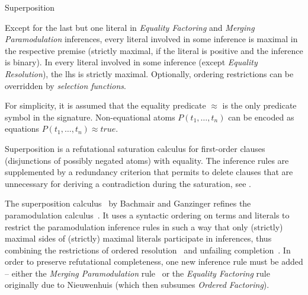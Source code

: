 \begin{entry}{Superposition}
\begin{calculus}
\vspace{\myspace}

Except for the last but one literal in
\textit{Equality Factoring} and \textit{Merging Paramodulation} inferences,
every literal involved in some inference
is maximal in the respective premise
(strictly maximal, if the literal is positive and the inference is binary).
In every literal involved in some inference
(except \textit{Equality Resolution}),
the lhs is strictly maximal.
Optionally,
ordering restrictions can be overridden by \emph{selection functions}.

\vspace{\myspace}

For simplicity, it is assumed that the equality predicate $\approx$
is the only predicate symbol in the signature.
Non-equational atoms $P(t_1,\dots,t_n)$ can be encoded as
equations $P(t_1,\dots,t_n) \approx \mathit{true}$.

% 
\end{calculus}



\begin{clarifications}
Superposition is a refutational saturation calculus for
first-order clauses (disjunctions of possibly negated atoms)
with equality.
The inference rules are supplemented by a redundancy criterion
that permits to delete clauses that are unnecessary for
deriving a contradiction during the saturation, see .
\end{clarifications}

\begin{history}
The superposition
calculus~\cite{BachmairGanzinger1990CTRS,BachmairGanzinger1994JLC}
by Bachmair and Ganzinger
refines the paramodulation calculus~.
It uses a syntactic ordering on terms and
literals to restrict the paramodulation inference rules
in such a way that only (strictly) maximal sides of (strictly) maximal
literals participate in inferences,
thus combining the restrictions of
ordered resolution~ and
unfailing completion~.
In order to preserve refutational completeness, one new
inference rule must be added -- either
the \textit{Merging Paramodulation} rule~\cite{BachmairGanzinger1990CTRS}
or the \textit{Equality Factoring} rule originally due to Nieuwenhuis
(which then subsumes \textit{Ordered Factoring}).


\end{history}
\end{entry}
